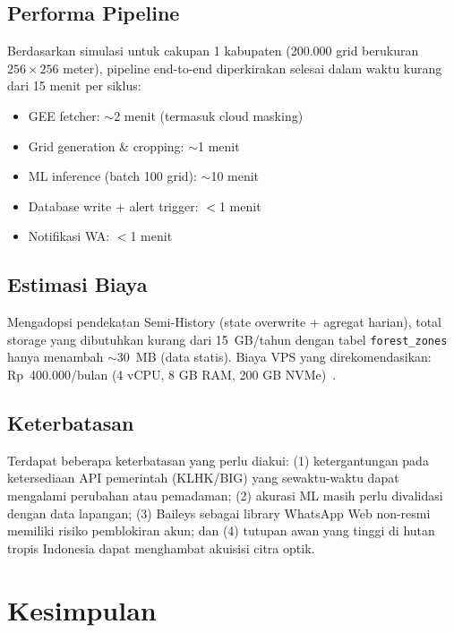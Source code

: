\documentclass[10pt,conference,a4paper]{IEEEtran}
\begin{document}
\subsection{Performa Pipeline}

Berdasarkan simulasi untuk cakupan 1 kabupaten (200.000 grid
berukuran $256 \times 256$ meter), pipeline end-to-end diperkirakan
selesai dalam waktu kurang dari 15 menit per siklus:
\begin{itemize}
    \item GEE fetcher: $\sim$2 menit (termasuk cloud masking)
    \item Grid generation \& cropping: $\sim$1 menit
    \item ML inference (batch 100 grid): $\sim$10 menit
    \item Database write + alert trigger: $<$1 menit
    \item Notifikasi WA: $<$1 menit
\end{itemize}

\subsection{Estimasi Biaya}

Mengadopsi pendekatan Semi-History (state overwrite + agregat harian),
total storage yang dibutuhkan kurang dari 15~GB/tahun dengan tabel
\texttt{forest\_zones} hanya menambah $\sim$30~MB (data statis).
Biaya VPS yang direkomendasikan: Rp~400.000/bulan (4 vCPU, 8 GB RAM,
200 GB NVMe)~\cite{storage}.

\subsection{Keterbatasan}

Terdapat beberapa keterbatasan yang perlu diakui: (1) ketergantungan
pada ketersediaan API pemerintah (KLHK/BIG) yang sewaktu-waktu dapat
mengalami perubahan atau pemadaman; (2) akurasi ML masih perlu
divalidasi dengan data lapangan; (3) Baileys sebagai library WhatsApp
Web non-resmi memiliki risiko pemblokiran akun; dan (4) tutupan awan
yang tinggi di hutan tropis Indonesia dapat menghambat akuisisi citra
optik.

\section{Kesimpulan}
\end{document}
